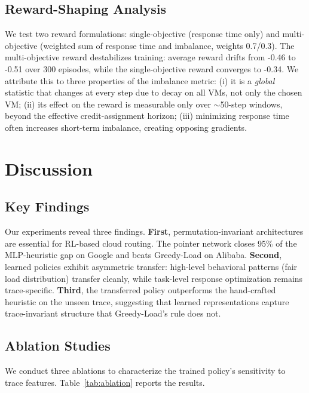 \documentclass[conference]{IEEEtran}
\begin{document}
\subsection{Reward-Shaping Analysis}

We test two reward formulations: single-objective (response time only) and multi-objective (weighted sum of response time and imbalance, weights 0.7/0.3). The multi-objective reward destabilizes training: average reward drifts from -0.46 to -0.51 over 300 episodes, while the single-objective reward converges to -0.34. We attribute this to three properties of the imbalance metric: (i) it is a \textit{global} statistic that changes at every step due to decay on all VMs, not only the chosen VM; (ii) its effect on the reward is measurable only over $\sim$50-step windows, beyond the effective credit-assignment horizon; (iii) minimizing response time often increases short-term imbalance, creating opposing gradients.

\section{Discussion}

\subsection{Key Findings}

Our experiments reveal three findings. \textbf{First}, permutation-invariant architectures are essential for RL-based cloud routing. The pointer network closes 95\% of the MLP-heuristic gap on Google and beats Greedy-Load on Alibaba. \textbf{Second}, learned policies exhibit asymmetric transfer: high-level behavioral patterns (fair load distribution) transfer cleanly, while task-level response optimization remains trace-specific. \textbf{Third}, the transferred policy outperforms the hand-crafted heuristic on the unseen trace, suggesting that learned representations capture trace-invariant structure that Greedy-Load's rule does not.
\subsection{Ablation Studies}

We conduct three ablations to characterize the trained policy's sensitivity to trace features. Table~\ref{tab:ablation} reports the results.
\end{document}
